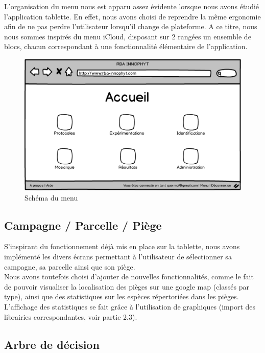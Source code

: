 \documentclass[twoside]{EPURapport}
\begin{document}
			L'organisation du menu nous est apparu assez évidente lorsque nous avons étudié l'application tablette. En effet, nous avons choisi de reprendre la même ergonomie afin de ne pas perdre l'utilisateur lorsqu'il change de plateforme. A ce titre, nous nous sommes inspirés du menu iCloud, disposant sur 2 rangées un ensemble de blocs, chacun correspondant à une fonctionnalité élémentaire de l'application.\\
			
			\begin{figure}[hbtp]
			\centering
			\includegraphics[scale=0.5]{images/menu.png}
			\caption{Schéma du menu}
		\end{figure}	
		
		\subsection{Campagne / Parcelle / Piège}
		
	S'inspirant du fonctionnement déjà mis en place sur la tablette, nous avons implémenté les divers écrans permettant à l'utilisateur de sélectionner sa campagne, sa parcelle ainsi que son piège.\\
	
	Nous avons toutefois choisi d'ajouter de nouvelles fonctionnalités, comme le fait de pouvoir visualiser la localisation des pièges sur une google map (classés par type), ainsi que des statistiques sur les espèces répertoriées dans les pièges. L'affichage des statistiques se fait grâce à l'utilisation de graphiques (import des librairies correspondantes, voir partie 2.3).
		
		\subsection{Arbre de décision}
		
\end{document}
